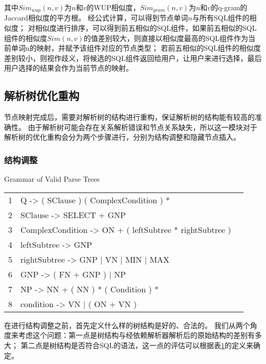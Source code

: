 其中$Sim_{wup}(n,v)$为$n$和$v$的WUP相似度\cite{wu1994verb}，$Sim_{gram}(n,v)$为$n$和$v$的q-gram的Jaccard相似度的平方根\cite{xiao2011efficient}。
经公式计算，可以得到节点单词$n$与所有SQL组件的相似度；
对相似度进行排序，可以得到前五相似的SQL组件，如果前五相似的SQL组件的相似度$Sim(n,v)$的值差别较大，则直接以相似度最高的SQL组件作为当前单词n的映射，并赋予该组件对应的节点类型；
若前五相似的SQL组件的相似度差别较小，则视作歧义，将候选的SQL组件返回给用户，让用户来进行选择，最后用户选择的结果会作为当前节点的映射。 


\subsection{解析树优化重构}
\label{nli:jxsyhcg}

节点映射完成后，需要对解析树的结构进行重构，保证解析树的结构能有较高的准确性。
由于解析树可能会存在关系解析错误和节点关系缺失，所以这一模块对于解析树的优化重构会分为两个步骤进行，分别为结构调整和隐藏节点插入。

\subsubsection{结构调整}

\begin{table}[!hpb]
  \centering
    {Grammar of Valid Parse Trees}
  \label{nli:hfjxsjggz}
  \begin{tabular}{@{}llr@{}} \toprule
    1  & 	Q -> ( SClause ) ( ComplexCondition ) *\\
    2  & 	SClause -> SELECT + GNP\\
    3  & 	ComplexCondition -> ON + ( leftSubtree * rightSubtree )\\
    4  & 	leftSubtree -> GNP\\
    5  & 	rightSubtree -> GNP | VN | MIN | MAX\\
    6  & 	GNP -> ( FN + GNP ) | NP\\
    7  & 	NP -> NN + ( NN ) * ( Condition ) *\\
    8  & 	condition -> VN | ( ON + VN )\\\bottomrule
  \end{tabular}
\end{table}

在进行结构调整之前，首先定义什么样的树结构是好的、合法的。
我们从两个角度来考虑这个问题：第一点是树结构与经依赖解析器解析后的原始结构的差别有多大；
第二点是树结构是否符合SQL的语法，这一点的评估可以根据表\ref{nli:hfjxsjggz}的定义来确定\cite{li2014constructing}。

